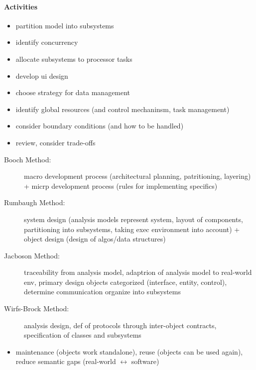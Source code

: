 \documentclass[a4paper, 10pt]{article}
\begin{document}
\paragraph{Activities}
\begin{itemize}
	\item partition model into subsystems
	\item identify concurrency
	\item allocate subsystems to processor tasks
	\item develop ui design
	\item choose strategy for data management
	\item identify global resources (and control mechaninsm, task management)
	\item consider boundary conditions (and how to be handled)
	\item review, consider trade-offs
\end{itemize}
\begin{description}
	\item[Booch Method:] macro development process (architectural planning, patritioning, layering) + micrp development process (rules for implementing specifics)
	\item[Rumbaugh Method:] system design (analysis models represent system, layout of components, partitioning into subsystems, taking exec environment into account) + object design (design of algos/data structures)
	\item[Jacboson Method:] traceability from analysis model, adaptrion of analysis model to real-world env, primary design objects categorized (interface, entity, control), determine communication \follows organize into subsystems
	\item[Wirfs-Brock Method:] analysis \follows design, def of protocols through inter-object contracts, specification of classes and subsystems
\end{description}
\begin{itemize}
	\item maintenance (objects work standalone), reuse (objects can be used again), reduce semantic gaps (real-world $\leftrightarrow$ software)
\end{itemize}
\end{document}
